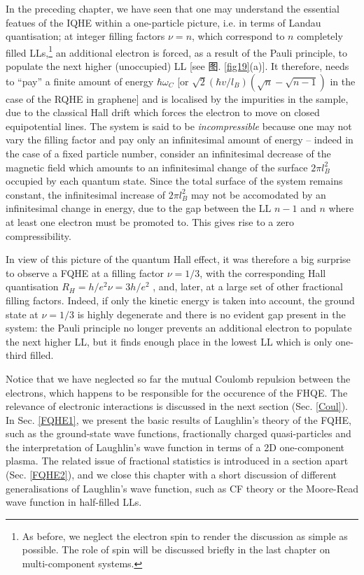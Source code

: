 \documentclass[10pt]{book}
\begin{document}
In the preceding chapter, we have seen that one may understand the essential featues of 
the IQHE within a one-particle picture, i.e. in terms
of Landau quantisation; at integer filling factors $\nu=n$, which correspond to $n$ completely filled LLs,\footnote{As before,
we neglect the electron spin to render the discussion as simple as possible. The role of spin will be discussed briefly in
the last chapter on multi-component systems.} an additional electron is forced, as a result of the Pauli principle, to 
populate the next higher (unoccupied) LL [see 图. \ref{fig19}(a)]. It therefore, needs to ``pay'' a finite amount of energy 
$\hbar\omega_C$ [or $\sqrt{2}(\hbar v/l_B)(\sqrt{n} - \sqrt{n-1})$ in the case of the RQHE in graphene] and is localised 
by the impurities in the sample, due to the classical Hall drift which forces the electron to move on closed equipotential lines. 
The system is said to be {\sl incompressible} because one may not vary the filling factor and pay only an infinitesimal amount
of energy -- indeed in the case of a fixed particle number, consider an infinitesimal decrease of the magnetic field 
which amounts to an infinitesimal change of the surface $2\pi l_B^2$ occupied by each quantum state. 
Since the total surface of the system remains constant, the infinitesimal increase of $2\pi l_B^2$ may not be accomodated by
an infinitesimal change in energy, due to the gap between the LL $n-1$ and $n$ where at least one electron must be promoted
to. This gives rise to a zero compressibility.



In view of this picture of the quantum Hall effect, it was therefore a big surprise to observe a FQHE at a filling factor
$\nu=1/3$, with the corresponding Hall quantisation $R_H = h/e^2\nu= 3 h/e^2$ \cite{TSG}, and, later, at a large set of other 
fractional filling factors. Indeed, if only the kinetic energy is taken into account, the ground state at $\nu=1/3$ is 
highly degenerate and there is no evident gap present in the system: the Pauli principle no longer prevents an additional 
electron to populate the next higher LL, but it finds enough place in the lowest LL which is only one-third filled. 

Notice that we have neglected so far the mutual Coulomb repulsion between the electrons, which happens to be responsible for the
occurence of the FHQE. The relevance of electronic interactions is discussed in the next section (Sec. \ref{Coul}). In Sec. \ref{FQHE1},
we present the basic results of Laughlin's theory of the FQHE, such as the ground-state wave functions, fractionally
charged quasi-particles and the interpretation of Laughlin's wave function in terms of a 2D one-component plasma.
The related issue of fractional statistics is introduced in a section apart (Sec. \ref{FQHE2}), and
we close this chapter with a short discussion of different generalisations of Laughlin's wave function, such as CF
theory or the Moore-Read wave function in half-filled LLs. 
\end{document}
